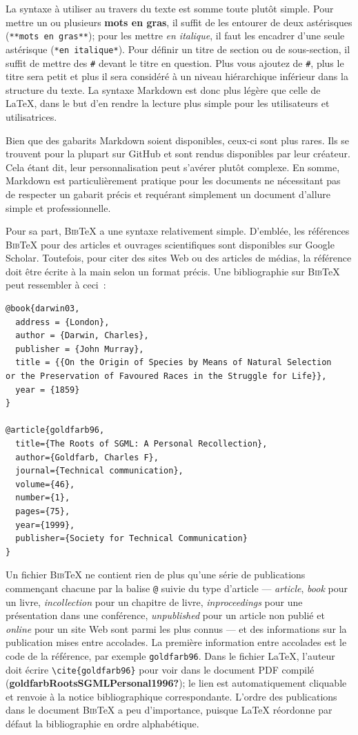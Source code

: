 \documentclass[
  letterpaper,
  DIV=11,
  numbers=noendperiod]{scrreprt}
\begin{document}
La syntaxe à utiliser au travers du texte est somme toute plutôt simple.
Pour mettre un ou plusieurs \textbf{mots en gras}, il suffit de les
entourer de deux astérisques (\texttt{**mots\ en\ gras**}); pour les
mettre \emph{en italique}, il faut les encadrer d'une seule astérisque
(\texttt{*en\ italique*}). Pour définir un titre de section ou de
sous-section, il suffit de mettre des \texttt{\#} devant le titre en
question. Plus vous ajoutez de \texttt{\#}, plus le titre sera petit et
plus il sera considéré à un niveau hiérarchique inférieur dans la
structure du texte. La syntaxe Markdown est donc plus légère que celle
de LaTeX, dans le but d'en rendre la lecture plus simple pour les
utilisateurs et utilisatrices.

Bien que des gabarits Markdown soient disponibles, ceux-ci sont plus
rares. Ils se trouvent pour la plupart sur GitHub et sont rendus
disponibles par leur créateur. Cela étant dit, leur personnalisation
peut s'avérer plutôt complexe. En somme, Markdown est particulièrement
pratique pour les documents ne nécessitant pas de respecter un gabarit
précis et requérant simplement un document d'allure simple et
professionnelle.

Pour sa part, \textsc{Bib}TeX a une syntaxe relativement simple.
D'emblée, les références \textsc{Bib}TeX pour des articles et ouvrages
scientifiques sont disponibles sur Google Scholar. Toutefois, pour citer
des sites Web ou des articles de médias, la référence doit être écrite à
la main selon un format précis. Une bibliographie sur \textsc{Bib}TeX
peut ressembler à ceci~:

\begin{verbatim}
@book{darwin03,
  address = {London},
  author = {Darwin, Charles},
  publisher = {John Murray},
  title = {{On the Origin of Species by Means of Natural Selection
or the Preservation of Favoured Races in the Struggle for Life}},
  year = {1859}
}

@article{goldfarb96,
  title={The Roots of SGML: A Personal Recollection},
  author={Goldfarb, Charles F},
  journal={Technical communication},
  volume={46},
  number={1},
  pages={75},
  year={1999},
  publisher={Society for Technical Communication}
}
\end{verbatim}

Un fichier \textsc{Bib}TeX ne contient rien de plus qu'une série de
publications commençant chacune par la balise \texttt{@} suivie du type
d'article --- \emph{article}, \emph{book} pour un livre,
\emph{incollection} pour un chapitre de livre, \emph{inproceedings} pour
une présentation dans une conférence, \emph{unpublished} pour un article
non publié et \emph{online} pour un site Web sont parmi les plus connus
--- et des informations sur la publication mises entre accolades. La
première information entre accolades est le code de la référence, par
exemple \texttt{goldfarb96}. Dans le fichier LaTeX, l'auteur doit écrire
\texttt{\textbackslash{}cite\{goldfarb96\}} pour voir dans le document
PDF compilé (\textbf{goldfarbRootsSGMLPersonal1996?}); le lien est
automatiquement cliquable et renvoie à la notice bibliographique
correspondante. L'ordre des publications dans le document
\textsc{Bib}TeX a peu d'importance, puisque LaTeX réordonne par défaut
la bibliographie en ordre alphabétique.
\end{document}
